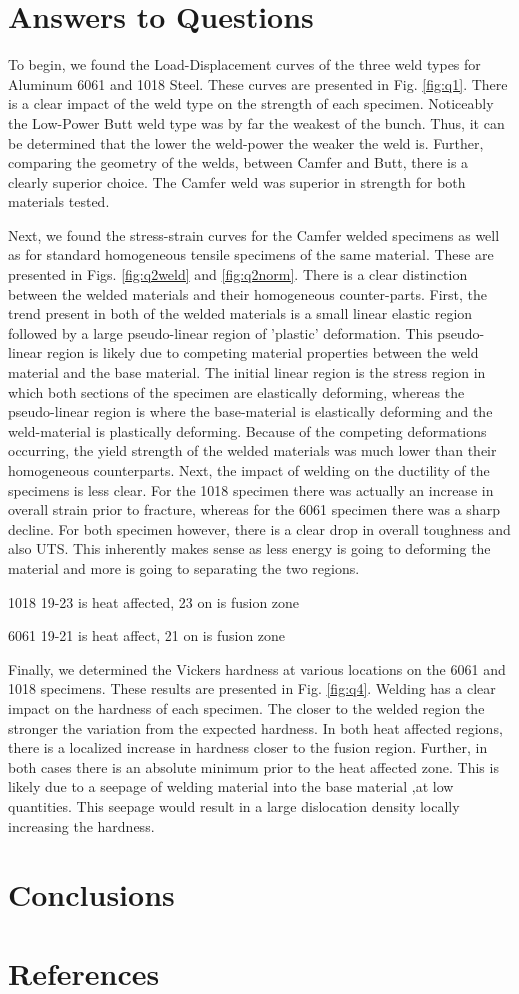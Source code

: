 \documentclass{article}
\begin{document}
\section{Answers to Questions}
To begin, we found the Load-Displacement curves of the three weld types for Aluminum 6061 and 1018 Steel. These curves are presented in Fig. \ref{fig:q1}. There is a clear impact of the weld type on the strength of each specimen. Noticeably the Low-Power Butt weld type was by far the weakest of the bunch. Thus, it can be determined that the lower the weld-power the weaker the weld is. Further, comparing the geometry of the welds, between Camfer and Butt, there is a clearly superior choice. The Camfer weld was superior in strength for both materials tested. 

Next, we found the stress-strain curves for the Camfer welded specimens as well as for standard homogeneous tensile specimens of the same material. These are presented in Figs. \ref{fig:q2weld} and \ref{fig:q2norm}. There is a clear distinction between the welded materials and their homogeneous counter-parts. First, the trend present in both of the welded materials is a small linear elastic region followed by a large pseudo-linear region of 'plastic' deformation. This pseudo-linear region is likely due to competing material properties between the weld material and the base material. The initial linear region is the stress region in which both sections of the specimen are elastically deforming, whereas the pseudo-linear region is where the base-material is elastically deforming and the weld-material is plastically deforming. Because of the competing deformations occurring, the yield strength of the welded materials was much lower than their homogeneous counterparts. Next, the impact of welding on the ductility of the specimens is less clear. For the 1018 specimen there was actually an increase in overall strain prior to fracture, whereas for the 6061 specimen there was a sharp decline. For both specimen however, there is a clear drop in overall toughness and also UTS. This inherently makes sense as less energy is going to deforming the material and more is going to separating the two regions. 

1018 19-23 is heat affected, 23 on is fusion zone

6061 19-21 is heat affect, 21 on is fusion zone

Finally, we determined the Vickers hardness at various locations on the 6061 and 1018 specimens. These results are presented in Fig. \ref{fig:q4}.
Welding has a clear impact on the hardness of each specimen. The closer to the welded region the stronger the variation from the expected hardness. In both heat affected regions, there is a localized increase in hardness closer to the fusion region. Further, in both cases there is an absolute minimum prior to the heat affected zone. This is likely due to a seepage of welding material into the base material ,at low quantities. This seepage would result in a large dislocation density locally increasing the hardness.

\section{Conclusions}

\section{References}

\printbibliography[heading = none]
\end{document}

